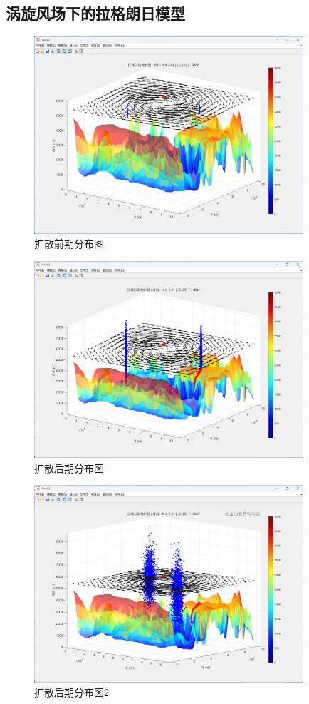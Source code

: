 \documentclass{article}
\begin{document}
	\subsection{涡旋风场下的拉格朗日模型}
	\FloatBarrier
	\begin{figure}[htbp]
		\centering
		\includegraphics[width=10cm]{Lagrange1.png}
		\caption{扩散前期分布图}
		\label{fig:your_label}
	\end{figure}
	\FloatBarrier
	\begin{figure}[htbp]
		\centering
		\includegraphics[width=10cm]{Lagrange2.png}
		\caption{扩散后期分布图}
		\label{fig:your_label}
	\end{figure}
	\FloatBarrier
	\begin{figure}[htbp]
		\centering
		\includegraphics[width=10cm]{Lagrange3.png}
		\caption{扩散后期分布图2}
		\label{fig:your_label}
	\end{figure}
	\FloatBarrier
	\newpage
\end{document}
